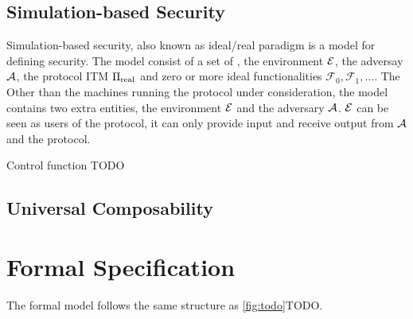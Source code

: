 \subsection{Simulation-based Security}
Simulation-based security, also known as ideal/real paradigm is a model for defining security.
The model consist of a set of , the environment $\mathcal{E}$, the adversay $\mathcal{A}$,
the protocol ITM $\Pi_{\text{real}}$ and zero or more ideal functionalities $\mathcal{F}_0, \mathcal{F}_1, \dots$.
The 
Other than the machines running the protocol under consideration, the model contains two extra entities,
the environment $\mathcal{E}$ and the adversary $\mathcal{A}$.
$\mathcal{E}$ can be seen as users of the protocol, it can only provide input and receive output from $\mathcal{A}$ and the protocol.

Control function TODO

\subsection{Universal Composability}

\section{Formal Specification}
\label{sec:formal-model}

The formal model follows the same structure as \ref{fig:todo}TODO.

